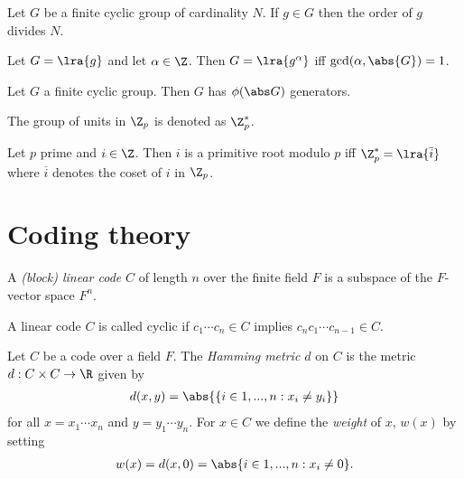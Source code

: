 \documentclass{article}
\begin{document}
\begin{theorem}
    Let $G$ be a finite cyclic group of cardinality $N$. If $g\in G$ then 
    the order of $g$ divides $N$.
\end{theorem}

\begin{theorem}
    Let $G=\lra{g}$ and let $\alpha\in\Z$. Then $G=\lra{g^\alpha}$ iff
    $\gcd(\alpha,\abs{G})=1$.
\end{theorem}

\begin{corollary}
    Let $G$ a finite cyclic group. Then $G$ has $\phi(\abs G)$ generators. 
\end{corollary}

\begin{definition}
    The group of units in $\Z_p$ is denoted as $\Z_p^*$.
\end{definition}

\begin{theorem}
    Let $p$ prime and $i\in\Z$. Then $i$ is a primitive root modulo $p$ iff
    $\Z_p^*=\lra{\overline i}$ where $\overline i$ denotes the coset of $i$ in
    $\Z_p$. 
\end{theorem}

\section{Coding theory}

\begin{definition}[Lecture 9]
    A \emph{(block) linear code} $C$ of length $n$ over the finite field $F$ is a subspace of the 
    $F$-vector space $F^n$.
\end{definition}

\begin{definition}
    A linear code $C$ is called cyclic if $c_1\cdots c_n\in C$ implies $c_nc_1\cdots c_{n-1}\in C$.
\end{definition}

\begin{definition}
    Let $C$ be a code over a field $F$. The \emph{Hamming metric $d$} on $C$ is the metric 
    $d:C\times C\to\R$ given by 
    \begin{align*}
        d(x,y) = \abs{\{i\in{1,...,n}:x_i\not=y_i\}}
    \end{align*} 
    for all $x=x_1\cdots x_n$ and $y=y_1\cdots y_n$.
    For $x\in C$ we define the \emph{weight} of $x$, $w(x)$ by setting 
    \begin{align*}
        w(x)=d(x,0)=\abs\{i\in {1,...,n} : x_i\not=0\}.
    \end{align*}
\end{definition}
\end{document}
